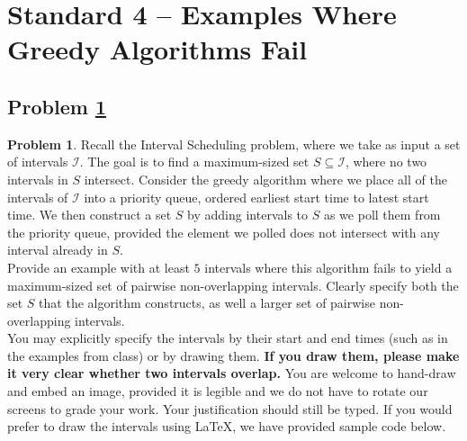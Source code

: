 \documentclass[11pt]{article}
\theoremstyle{definition}
\theoremstyle{definition}
\newtheorem{required}{Problem}
\theoremstyle{definition}
\begin{document}
\clearpage
\section{Standard 4 -- Examples Where Greedy Algorithms Fail}

\setcounter{subsection}{2}
\subsection{Problem \ref{GreedyFail1}}
\begin{required} \label{GreedyFail1}
Recall the \textsf{Interval Scheduling} problem, where we take as input a set of intervals $\mathcal{I}$. The goal is to find a maximum-sized set $S \subseteq \mathcal{I}$, where no two intervals in $S$ intersect. Consider the greedy algorithm where we place all of the intervals of $\mathcal{I}$ into a priority queue, ordered earliest start time to latest start time. We then construct a set $S$ by adding intervals to $S$ as we poll them from the priority queue, provided the element we polled does not intersect with any interval already in $S$. \\

\noindent Provide an example with at least $5$ intervals where this algorithm fails to yield a maximum-sized set of pairwise non-overlapping intervals. Clearly specify both the set $S$ that the algorithm constructs, as well a larger set of pairwise non-overlapping intervals. \\

\noindent You may explicitly specify the intervals by their start and end times (such as in the examples from class) or by drawing them. \textbf{If you draw them, please make it very clear whether two intervals overlap.} You are welcome to hand-draw and embed an image, provided it is legible and we do not have to rotate our screens to grade your work. Your justification should still be typed. If you would prefer to draw the intervals using \LaTeX, we have provided sample code below.
\end{required}
\end{document}
